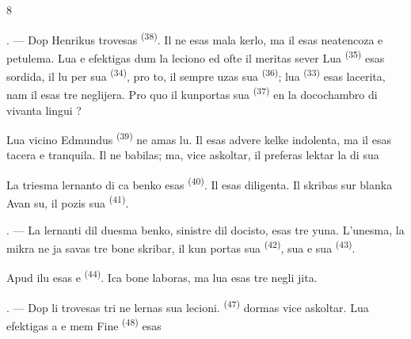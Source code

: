 \begin{VUpage}[10]{8}
\VUsaut{4.2mm}
\VUsaut{3.2mm}

. --- Dop Henrikus trovesas  \textsuperscript{(38)}.\nl
Il ne esas mala kerlo, ma il esas \nl
neatencoza e petulema. Lua  e \cc
{} efektigas  dum la leciono ed ofte\nl
il meritas sever  Lua  \textsuperscript{(35)}\nl
esas sordida, il  lu per sua\nl
{} \textsuperscript{(34)}, pro to, il sempre uzas sua \cc
{} \textsuperscript{(36)}; lua  \textsuperscript{(33)} esas lacerita,\nl
nam il esas tre neglijera. Pro quo il kunportas\nl
sua  \textsuperscript{(37)} en la docochambro di \nl
vivanta lingui ?

\VUblancAlinea
Lua vicino Edmundus \textsuperscript{(39)} ne amas lu. Il esas\nl
advere kelke indolenta, ma il esas tacera e\nl
tranquila. Il ne babilas; ma, vice askoltar, il\nl
preferas lektar la  di sua 

\VUblancAlinea
La triesma lernanto di ca benko esas \cc
{} \textsuperscript{(40)}. Il esas diligenta. Il skribas sur\nl
blanka  Avan su, il pozis sua \cc
{} \textsuperscript{(41)}.

. --- La lernanti dil duesma benko, sinistre\nl
dil docisto, esas tre yuna. L'unesma, la mikra\nl
{} ne ja savas tre bone skribar, il kun\cc
portas sua  \textsuperscript{(42)}, sua  e sua\nl
{} \textsuperscript{(43)}.

\VUblancAlinea
Apud ilu esas  e  \textsuperscript{(44)}. Ica\nl
bone laboras, ma lua  esas tre negli\cc
jita.

. --- Dop li trovesas tri \cc
{} ne lernas sua lecioni.  \textsuperscript{(47)} dormas\nl
vice askoltar. Lua  efektigas a \nl
{} e mem  Fine  \textsuperscript{(48)} esas
\parplein
\end{VUpage}

